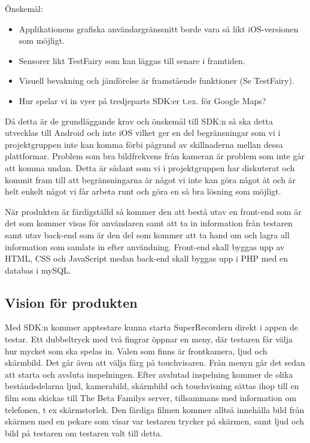 Önskemål:

\begin{itemize}
	\item Applikationens grafiska användargränssnitt borde vara så likt iOS-versionen som möjligt.
	\item Sensorer likt TestFairy som kan läggas till senare i framtiden.
	\item Visuell bevakning och jämförelse är framstående funktioner (Se TestFairy).
	\item Hur spelar vi in vyer på tredjeparts SDK:er t.ex. för Google Maps?
\end{itemize}


Då detta är de grundläggande krav och önskemål till SDK:n så ska detta utvecklas till Android och inte iOS vilket ger en del begränsningar som vi i projektgruppen inte kan komma förbi pågrund av skillnaderna mellan dessa plattformar. Problem som bra bildfrekvens från kameran är problem som inte går att komma undan. Detta är sådant som vi i projektgruppen har diskuterat och kommit fram till att begränsningarna är något vi inte kan göra något åt och är helt enkelt något vi får arbeta runt och göra en så bra lösning som möjligt.

När produkten är färdigställd så kommer den att bestå utav en front-end som är det som kommer visas för användaren samt att ta in information från testaren samt utav back-end som är den del som kommer att ta hand om och lagra all information som samlats in efter användning. Front-end skall byggas upp av HTML, CSS och JavaScript medan back-end skall byggas upp i PHP med en databas i mySQL. \parencite{catalog}

\subsection{Vision för produkten}
Med SDK:n kommer apptestare kunna starta SuperRecordern direkt i appen de testar. Ett dubbeltryck med två fingrar öppnar en meny, där testaren får välja hur mycket som ska spelas in. Valen som finns är frontkamera, ljud och skärmbild. Det går även att välja färg på touchvisaren. Från menyn går det sedan att starta och avsluta inspelningen. 
Efter avslutad inspelning kommer de olika beståndsdelarna ljud, kamerabild, skärmbild och touchvisning sättas ihop till en film som skickas till The Beta Familys server, tillsammans med information om telefonen, t ex skärmstorlek. Den färdiga filmen kommer alltså innehålla bild från skärmen med en pekare som visar var testaren trycker på skärmen, samt ljud och bild på testaren om testaren valt till detta.

